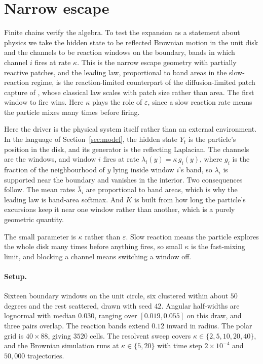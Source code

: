 \documentclass[11pt]{article}
\theoremstyle{remark}
\newcommand{\lbar}{\bar{\lambda}}
\begin{document}
\section{Narrow escape}\label{sec:escape}

Finite chains verify the algebra. To test the expansion as a statement about
physics we take the hidden state to be reflected Brownian motion in the unit
disk and the channels to be reaction windows on the boundary, bands in which
channel $i$ fires at rate $\kappa$. This is the narrow escape geometry
\citep{schuss2007} with partially reactive patches, and the leading law, proportional
to band areas in the slow-reaction regime, is the reaction-limited counterpart
of the diffusion-limited patch capture of \citet{berg1977}, whose classical
law scales with patch size rather than area. The first window to fire wins. Here
$\kappa$ plays the role of $\varepsilon$, since a slow reaction rate means the
particle mixes many times before firing.

Here the driver is the physical system itself rather than an external
environment. In the language of Section~\ref{sec:model}, the hidden state
$Y_t$ is the particle's position in the disk, and
its generator is the reflecting Laplacian. The channels are the windows, and
window $i$ fires at rate $\lambda_i(y) = \kappa\, g_i(y)$, where $g_i$ is the
fraction of the neighbourhood of $y$ lying inside window $i$'s band, so
$\lambda_i$ is supported near the boundary and vanishes in the interior. Two
consequences follow. The mean rates $\lbar_i$ are proportional to band areas,
which is why the leading law is band-area softmax. And $K$ is built from how
long the particle's excursions keep it near one window rather than another,
which is a purely geometric quantity.

The small parameter is $\kappa$ rather than $\varepsilon$. Slow reaction means
the particle explores the whole disk many times before anything fires, so small
$\kappa$ is the fast-mixing limit, and blocking a channel means switching a
window off.

\paragraph{Setup.} Sixteen boundary windows on the unit circle, six clustered
within about $50$ degrees and the rest scattered, drawn with seed $42$. Angular
half-widths are lognormal with median $0.030$, ranging over $[0.019, 0.055]$ on
this draw, and three pairs overlap. The reaction bands extend $0.12$ inward in
radius. The polar grid is $40 \times 88$, giving $3520$ cells. The resolvent
sweep covers $\kappa \in \{2, 5, 10, 20, 40\}$, and the Brownian simulation
runs at $\kappa \in \{5, 20\}$ with time step $2\times10^{-4}$ and
$50{,}000$ trajectories.
\end{document}
